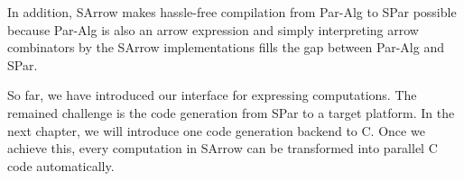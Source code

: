 In addition, SArrow makes hassle-free compilation from Par-Alg to SPar possible because Par-Alg is also an arrow expression and simply interpreting arrow combinators by the SArrow implementations fills the gap between Par-Alg and SPar.

So far, we have introduced our interface for expressing computations. The remained challenge is the code generation from SPar to a target platform. In the next chapter, we will introduce one code generation backend to C. Once we achieve this, every computation in SArrow can be transformed into parallel C code automatically.